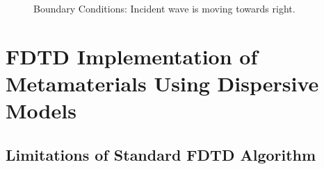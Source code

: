 \documentclass[10pt,A4paper]{report}
\begin{document}
\begin{figure}[H]
\mbox{\quad{}}
\caption{Boundary Conditions: Incident wave is moving towards right.}
\label{Boundary-Conditions}
\end{figure}

\chapter{FDTD Implementation of Metamaterials Using Dispersive Models}
\section{Limitations of Standard FDTD Algorithm}
\end{document}
